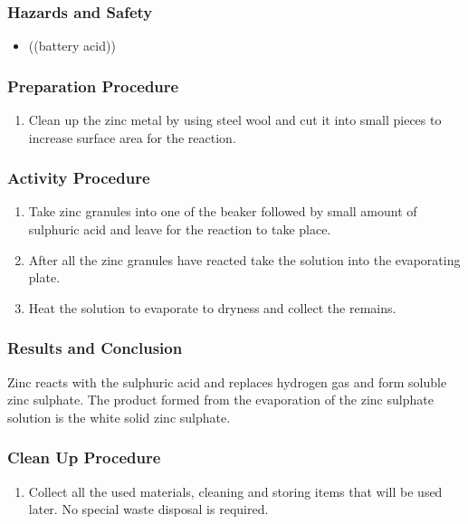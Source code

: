 \subsubsection*{Hazards and Safety}
\begin{itemize}
\item{((battery acid))}
\end{itemize}

\subsubsection*{Preparation Procedure}
\begin{enumerate}
\item{Clean up the zinc metal by using steel wool and cut it into small pieces to increase surface area for the reaction.}
\end{enumerate}

\subsubsection*{Activity Procedure}
\begin{enumerate}
\item{Take zinc granules into one of the beaker followed by small amount of sulphuric acid and leave for the reaction to take place.}
\item{After all the zinc granules have reacted take the solution into the evaporating plate.}
\item{Heat the solution to evaporate to dryness and collect the remains.}
\end{enumerate}

\subsubsection*{Results and Conclusion}
Zinc reacts with the sulphuric acid and replaces hydrogen gas and form soluble zinc sulphate. The product formed from the evaporation of the zinc sulphate solution is the white solid zinc sulphate.

\subsubsection*{Clean Up Procedure}
\begin{enumerate}
\item{Collect all the used materials, cleaning and storing items that will be used later. No special waste disposal is required.}
\end{enumerate}

